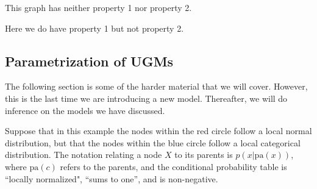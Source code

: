 \documentclass{article}
\begin{document}
\begin{center}
\end{center}
This graph has neither property 1 nor property 2.

\begin{center}
\end{center}
Here we do have property 1 but not property 2.


\subsection{Parametrization of UGMs}

The following section is some of the harder material that we will cover. However, this is the last time we are introducing a new model. Thereafter, we will do inference on the models we have discussed.
\smallskip

\begin{center}
\end{center}
Suppose that in this example the nodes within the red circle follow a local normal distribution, but that the nodes within the blue circle follow a local categorical distribution. The notation relating a node $X$ to its parents is $p(x|\text{pa}(x))$, where $\text{pa}(c)$ refers to the parents, and the conditional probability table is ``locally normalized", ``sums to one'', and is non-negative.
\smallskip
\end{document}
